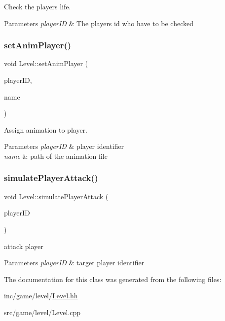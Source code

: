 Check the player\textquotesingle{}s life. 


\begin{DoxyParams}{Parameters}
{\em player\+ID} & The player\textquotesingle{}s id who have to be checked \\
\hline
\end{DoxyParams}
\mbox{\label{classLevel_a2330b2345dcf859700874c29b1f524e0}} 
\subsubsection{\texorpdfstring{set\+Anim\+Player()}{setAnimPlayer()}}
{\footnotesize\ttfamily void Level\+::set\+Anim\+Player (\begin{DoxyParamCaption}\item[{const Unsigned\+Int \&}]{player\+ID,  }\item[{String}]{name }\end{DoxyParamCaption})}



Assign animation to player. 


\begin{DoxyParams}{Parameters}
{\em player\+ID} & player identifier \\
\hline
{\em name} & path of the animation file \\
\hline
\end{DoxyParams}
\mbox{\label{classLevel_ad31dd05f4278c778da85e79a0fd04430}} 
\subsubsection{\texorpdfstring{simulate\+Player\+Attack()}{simulatePlayerAttack()}}
{\footnotesize\ttfamily void Level\+::simulate\+Player\+Attack (\begin{DoxyParamCaption}\item[{const Unsigned\+Int \&}]{player\+ID }\end{DoxyParamCaption})}



attack player 


\begin{DoxyParams}{Parameters}
{\em player\+ID} & target player identifier \\
\hline
\end{DoxyParams}


The documentation for this class was generated from the following files\+:\begin{DoxyCompactItemize}
\item 
inc/game/level/\hyperlink{Level_8hh}{Level.\+hh}\item 
src/game/level/Level.\+cpp\end{DoxyCompactItemize}
